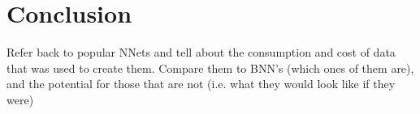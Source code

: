\chapter{Conclusion}

Refer back to popular NNets and tell about the consumption and cost of data that was used to create them.  Compare them to BNN's (which ones of them are), and the potential for those that are not (i.e. what they would look like if they were)